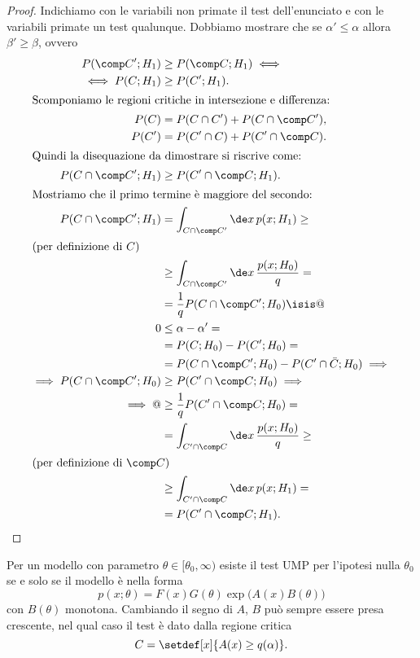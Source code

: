 \begin{proof}
	Indichiamo con le variabili non primate il test dell'enunciato
	e con le variabili primate un test qualunque.
	Dobbiamo mostrare che se $\alpha'\le\alpha$ allora $\beta'\ge\beta$,
	ovvero
	\begin{align*}
		P(\comp C';H_1)
		&\ge P(\comp C;H_1) \iff \\
		\iff P(C;H_1)
		&\ge P(C';H_1). \\
		\intertext{Scomponiamo le regioni critiche in intersezione e differenza:}
		P(C)
		&= P(C\cap C') + P(C\cap\comp C'), \\
		P(C')
		&= P(C'\cap C) + P(C'\cap\comp C). \\
		\intertext{Quindi la disequazione da dimostrare si riscrive come:}
		P(C\cap\comp C';H_1)
		&\ge P(C'\cap\comp C;H_1). \\
		\intertext{Mostriamo che il primo termine è maggiore del secondo:}
		P(C\cap\comp C';H_1)
		&= \int_{C\cap\comp C'} \de x\, p(x;H_1) \ge \\
		\intertext{(per definizione di $C$)}
		&\ge \int_{C\cap\comp C'} \de x\, \frac{p(x;H_0)}q = \\
		&= \frac1q P(C\cap\comp C';H_0) \isis @ \\
		0
		&\le \alpha - \alpha' = \\
		&= P(C;H_0) - P(C';H_0) = \\
		&= P(C\cap\comp C';H_0) - P(C'\cap\bar C;H_0) \implies \\
		\implies P(C\cap\comp C';H_0)
		&\ge P(C'\cap\comp C;H_0) \implies \\
		\implies @
		&\ge \frac1q P(C'\cap\comp C;H_0) = \\
		&= \int_{C'\cap\comp C} \de x\, \frac{p(x;H_0)}q \ge \\
		\intertext{(per definizione di $\comp C$)}
		&\ge \int_{C'\cap\comp C} \de x\, p(x;H_1) = \\
		&= P(C'\cap\comp C;H_1). \qedhere
	\end{align*}
\end{proof}

\begin{fact}
	\label{th:umpge}
	Per un modello con parametro $\theta\in[\theta_0,\infty)$
	esiste il test UMP per l'ipotesi nulla $\theta_0$
	se e solo se il modello è nella forma
	\begin{equation*}
		p(x;\theta)
		= F(x) G(\theta) \exp\big(A(x) B(\theta)\big)
	\end{equation*}
	con $B(\theta)$ monotona.
	Cambiando il segno di $A$, $B$ può sempre essere presa crescente,
	nel qual caso il test è dato dalla regione critica
	\begin{equation*}
		C = \setdef[x]{A(x) \ge q(\alpha)}.
	\end{equation*}
\end{fact}


